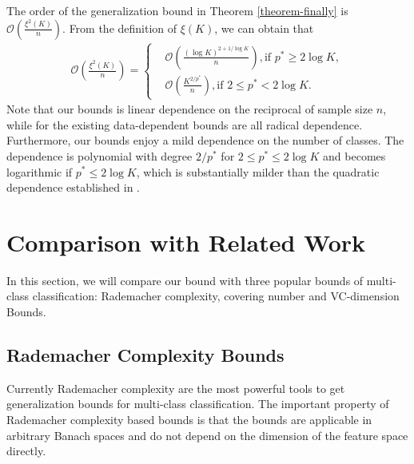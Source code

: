 \documentclass{article}
\begin{document}
The order of the  generalization bound in Theorem \ref{theorem-finally} is
$
 \mathcal{O}\left(\frac{\xi^2(K)}{n}\right).
$
From the definition of $\xi(K)$, we can obtain that
 \begin{align*}
  \mathcal{O}\left(\frac{\xi^2(K)}{n}\right)=
  \left\{
      \begin{aligned}
      &\mathcal{O}\left(\frac{(\log K)^{2+{1}/{\log K}}}{n}\right), \text{if } p^\ast\geq 2\log K,\\
      &\mathcal{O}\left(\frac{K^{2/p^\ast}}{n}\right), \text{if } 2\leq p^\ast< 2\log K.
      \end{aligned}
      \right.
  \end{align*}
  Note that our bounds is linear dependence on the reciprocal of sample size $n$,
  while for the existing data-dependent bounds are all radical dependence.
Furthermore,
  our bounds enjoy a mild dependence on the number of classes.
  The dependence is polynomial with degree $2/p^\ast$ for $2\leq p^\ast\leq 2\log K$ and
  becomes logarithmic if $p^\ast\leq 2\log K$,
  which is substantially milder than the quadratic dependence
  established in \cite{koltchinskii2002empirical,koltchinskii2001some,mohri2012foundations,cortes2013multi}.


\section{Comparison with Related Work}
In this section, we will compare our bound with three popular bounds of multi-class classification:
 Rademacher complexity, covering number and VC-dimension Bounds.
\subsection{Rademacher Complexity Bounds}
Currently Rademacher complexity are the most powerful tools to get generalization bounds for
multi-class classification.
The important property of Rademacher complexity based bounds is that the
bounds are applicable in arbitrary Banach spaces and do not depend on the dimension of the feature
space directly.
\end{document}
